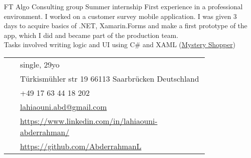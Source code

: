 \documentclass[10pt]{article} %
\begin{document}
\begin{paracol}{2}
\vspace{-\baselineskip}\medskip %

{FT} %
{Algo Consulting group} %
{Summer internship} %
{First experience in a professional environment. I worked on a customer survey mobile application. I was given 3 days to acquire basics of .NET, Xamarin.Forms and make a first prototype of the app, which I did and became part of the production team. \\ Tasks involved writing logic and UI using C\# and XAML (\href{https://play.google.com/store/apps/details?id=ma.ram.customersurvey\&hl=en}{Mystery Shopper})}  %


\vspace{-\baselineskip}\medskip %

\medskip %


\switchcolumn %


\parbox[top][0.12\textheight][c]{\linewidth}{ %
	\vspace{-0.04\textheight} %
	\colorbox{shade}{ %
		\begin{supertabular}{p{0.05\linewidth}|p{0.775\linewidth}} %
			\raisebox{-1pt}{\faUser} & single, 29yo\\ %
			\raisebox{-1pt}{\faHome} & Türkismühler str 19 66113 Saarbrücken Deutschland \\ %
			\raisebox{-1pt}{\faPhone} & +49 17 63 44 18 202 \\ %
			\raisebox{0pt}{\small\faEnvelope} & \href{mailto:lahiaouni.abd@gmail.com}{lahiaouni.abd@gmail.com} \\ %
			\raisebox{-1pt}{\faLinkedinSquare} & \href{https://www.linkedin.com/in/lahiaouni-abderrahman/}{https://www.linkedin.com/in/lahiaouni-abderrahman/} \\ %
			\raisebox{-1pt}{\faLinkedinSquare} & \href{https://github.com/AbderrahmanL}{https://github.com/AbderrahmanL} \\ %
		\end{supertabular}
	}
}


\end{paracol}
\end{document}

